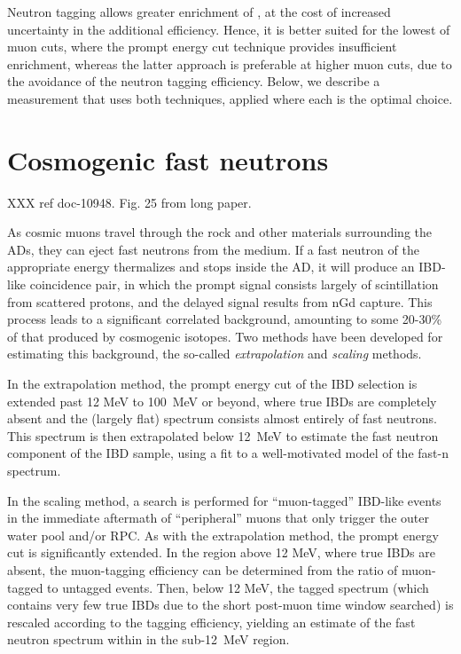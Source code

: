 \documentclass[../thesis.tex]{subfiles}
\begin{document}
Neutron tagging allows greater enrichment of \linine, at the cost of increased
uncertainty in the additional efficiency. Hence, it is better suited for the
lowest of muon cuts, where the prompt energy cut technique provides insufficient
enrichment, whereas the latter approach is preferable at higher muon cuts, due
to the avoidance of the neutron tagging efficiency. Below, we describe a
measurement that uses both techniques, applied where each is the optimal choice.

\section{Cosmogenic fast neutrons}

XXX ref doc-10948. Fig. 25 from long paper.

As cosmic muons travel through the rock and other materials surrounding the ADs,
they can eject fast neutrons from the medium. If a fast neutron of the
appropriate energy thermalizes and stops inside the AD, it will produce an
IBD-like coincidence pair, in which the prompt signal consists largely of
scintillation from scattered protons, and the delayed signal results from nGd
capture. This process leads to a significant correlated background, amounting to
some 20-30\% of that produced by cosmogenic isotopes. Two methods have been
developed for estimating this background, the so-called \emph{extrapolation} and
\emph{scaling} methods.

In the extrapolation method, the prompt energy cut of the IBD selection is
extended past 12 MeV to 100~MeV or beyond, where true IBDs are completely absent
and the (largely flat) spectrum consists almost entirely of fast neutrons. This
spectrum is then extrapolated below 12~MeV to estimate the fast neutron
component of the IBD sample, using a fit to a well-motivated model of the fast-n
spectrum.

In the scaling method, a search is performed for ``muon-tagged'' IBD-like events
in the immediate aftermath of ``peripheral'' muons that only trigger the outer
water pool and/or RPC. As with the extrapolation method, the prompt energy cut
is significantly extended. In the region above 12 MeV, where true IBDs are
absent, the muon-tagging efficiency can be determined from the ratio of
muon-tagged to untagged events. Then, below 12 MeV, the tagged spectrum (which
contains very few true IBDs due to the short post-muon time window searched) is
rescaled according to the tagging efficiency, yielding an estimate of the fast
neutron spectrum within in the sub-12~MeV region.
\end{document}
